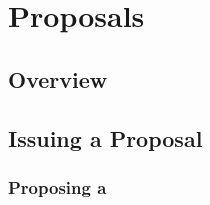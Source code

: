 
\chapter{Proposals}
\label{chapter.proposals}


\section{Overview}

\section{Issuing a Proposal}
\label{section.issuing.a.proposal}

\subsection{}
\label{subsection.proposal.class}

\subsection{Proposing a }
\label{subsection.proposing}


